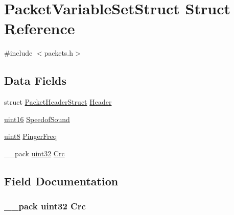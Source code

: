 \hypertarget{struct_packet_variable_set_struct}{}\section{Packet\+Variable\+Set\+Struct Struct Reference}
\label{struct_packet_variable_set_struct}


{\ttfamily \#include $<$packets.\+h$>$}

\subsection*{Data Fields}
\begin{DoxyCompactItemize}
\item 
struct \hyperlink{struct_packet_header_struct}{Packet\+Header\+Struct} \hyperlink{struct_packet_variable_set_struct_ab201af50281aff5ed4f984f994938007}{Header}
\item 
\hyperlink{_h_y_d_r_a_s_8_x_2types_8h_ac2a9e79eb120216f855626495b7bd18a}{uint16} \hyperlink{struct_packet_variable_set_struct_aa471f2dae040fec6c10389988ebf3fb6}{Speedof\+Sound}
\item 
\hyperlink{_h_y_d_r_a_s_8_x_2types_8h_a33a5e996e7a90acefb8b1c0bea47e365}{uint8} \hyperlink{struct_packet_variable_set_struct_a06fd1f9ebef45b2d268a1aebea84d828}{Pinger\+Freq}
\item 
\+\_\+\+\_\+pack \hyperlink{_h_y_d_r_a_s_8_x_2types_8h_acbd4acd0d29e2d6c43104827f77d9cd2}{uint32} \hyperlink{struct_packet_variable_set_struct_a9ac0191cb1217dfb4164ca0e333de3ac}{Crc}
\end{DoxyCompactItemize}


\subsection{Field Documentation}
\hypertarget{struct_packet_variable_set_struct_a9ac0191cb1217dfb4164ca0e333de3ac}{}
\subsubsection[{Crc}]{\setlength{\rightskip}{0pt plus 5cm}\+\_\+\+\_\+pack {\bf uint32} Crc}\label{struct_packet_variable_set_struct_a9ac0191cb1217dfb4164ca0e333de3ac}
\hypertarget{struct_packet_variable_set_struct_ab201af50281aff5ed4f984f994938007}{}
